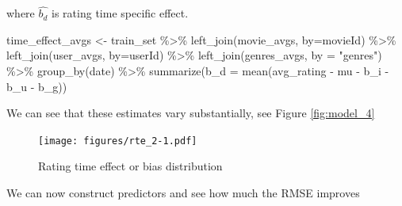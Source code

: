 \documentclass[
]{article}
\newenvironment{Shaded}{}{}
\newcommand{\AttributeTok}[1]{\textcolor[rgb]{0.49,0.56,0.16}{#1}}
\newcommand{\DecValTok}[1]{\textcolor[rgb]{0.25,0.63,0.44}{#1}}
\newcommand{\FloatTok}[1]{\textcolor[rgb]{0.25,0.63,0.44}{#1}}
\newcommand{\FunctionTok}[1]{\textcolor[rgb]{0.02,0.16,0.49}{#1}}
\newcommand{\NormalTok}[1]{#1}
\newcommand{\OtherTok}[1]{\textcolor[rgb]{0.00,0.44,0.13}{#1}}
\newcommand{\SpecialCharTok}[1]{\textcolor[rgb]{0.25,0.44,0.63}{#1}}
\newcommand{\StringTok}[1]{\textcolor[rgb]{0.25,0.44,0.63}{#1}}
\begin{document}
where \(\hat{b_{d}}\) is rating time specific effect.

\begin{Shaded}
\begin{Highlighting}[]
\NormalTok{time\_effect\_avgs }\OtherTok{\textless{}{-}}\NormalTok{ train\_set }\SpecialCharTok{\%\textgreater{}\%}
  \FunctionTok{left\_join}\NormalTok{(movie\_avgs, }\AttributeTok{by=}\StringTok{\textquotesingle{}movieId\textquotesingle{}}\NormalTok{) }\SpecialCharTok{\%\textgreater{}\%}
  \FunctionTok{left\_join}\NormalTok{(user\_avgs, }\AttributeTok{by=}\StringTok{\textquotesingle{}userId\textquotesingle{}}\NormalTok{) }\SpecialCharTok{\%\textgreater{}\%} 
  \FunctionTok{left\_join}\NormalTok{(genres\_avgs, }\AttributeTok{by =} \StringTok{"genres"}\NormalTok{) }\SpecialCharTok{\%\textgreater{}\%} 
  \FunctionTok{group\_by}\NormalTok{(date) }\SpecialCharTok{\%\textgreater{}\%} 
  \FunctionTok{summarize}\NormalTok{(}\AttributeTok{b\_d =} \FunctionTok{mean}\NormalTok{(avg\_rating }\SpecialCharTok{{-}}\NormalTok{ mu }\SpecialCharTok{{-}}\NormalTok{ b\_i }\SpecialCharTok{{-}}\NormalTok{ b\_u }\SpecialCharTok{{-}}\NormalTok{ b\_g))}
\end{Highlighting}
\end{Shaded}

\newpage

We can see that these estimates vary substantially, see Figure
\ref{fig:model_4}

\begin{figure}
\centering
\texttt{[image: figures/rte\_2-1.pdf]}
\caption{Rating time effect or bias distribution\label{fig:model_5}}
\end{figure}

We can now construct predictors and see how much the RMSE improves

\begin{Shaded}
\end{Shaded}
\end{document}
